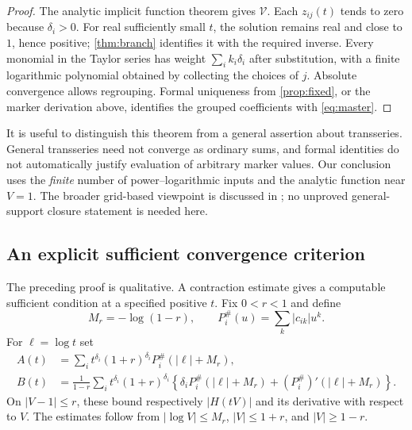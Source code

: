 \documentclass[11pt,a4paper]{article}
\numberwithin{equation}{section}
\theoremstyle{definition}\newtheorem{definition}[theorem]{Definition}
\theoremstyle{remark}\newtheorem{remark}[theorem]{Remark}
\begin{document}
\begin{proof}
The analytic implicit function theorem gives $\mathcal V$. Each
$z_{ij}(t)$ tends to zero because $\delta_i>0$. For real sufficiently
small $t$, the solution remains real and close to $1$, hence positive;
\cref{thm:branch} identifies it with the required inverse. Every monomial
in the Taylor series has weight $\sum_i k_i\delta_i$ after substitution,
with a finite logarithmic polynomial obtained by collecting the choices
of $j$. Absolute convergence allows regrouping. Formal uniqueness from
\cref{prop:fixed}, or the marker derivation above, identifies the grouped
coefficients with \cref{eq:master}.
\end{proof}

It is useful to distinguish this theorem from a general assertion about
transseries. General transseries need not converge as ordinary sums, and
formal identities do not automatically justify evaluation of arbitrary
marker values. Our conclusion uses the \emph{finite} number of
power--logarithmic inputs and the analytic function near $V=1$. The
broader grid-based viewpoint is discussed in \cite{edgar-beginners,edgar-grids};
no unproved general-support closure statement is needed here.

\subsection{An explicit sufficient convergence criterion}

The preceding proof is qualitative. A contraction estimate gives a
computable sufficient condition at a specified positive $t$. Fix
$0<r<1$ and define
\[
 M_r=-\log(1-r),\qquad
 P_i^\#(u)=\sum_k |c_{ik}|u^k.
\]
For $\ell=\log t$ set
\begin{align}
 A(t)&=\sum_i t^{\delta_i}(1+r)^{\delta_i}
          P_i^\#(|\ell|+M_r),\label{eq:A}\\
 B(t)&=\frac1{1-r}\sum_i t^{\delta_i}(1+r)^{\delta_i}
 \left\{\delta_iP_i^\#(|\ell|+M_r)
                  +(P_i^\#)'(|\ell|+M_r)\right\}.
 \label{eq:B}
\end{align}
On $|V-1|\le r$, these bound respectively $|H(tV)|$ and its derivative
with respect to $V$. The estimates follow from
$|\log V|\le M_r$, $|V|\le1+r$, and $|V|\ge1-r$.
\end{document}
